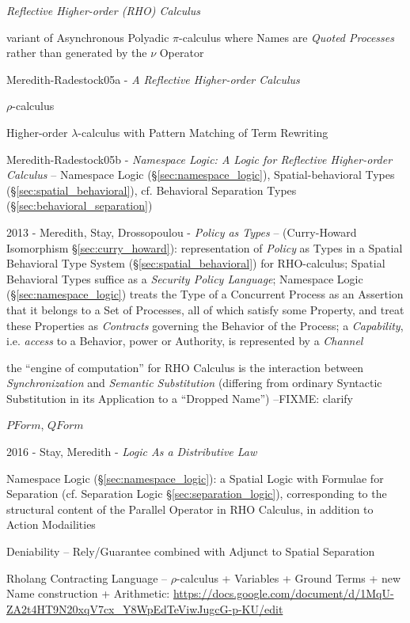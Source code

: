 \emph{Reflective Higher-order (RHO) Calculus}

variant of Asynchronous Polyadic $\pi$-calculus where Names are \emph{Quoted
  Processes} rather than generated by the $\nu$ Operator

Meredith-Radestock05a - \emph{A Reflective Higher-order Calculus}

$\rho$-calculus

Higher-order $\lambda$-calculus with Pattern Matching of Term
Rewriting %

Meredith-Radestock05b - \emph{Namespace Logic: A Logic for Reflective
  Higher-order Calculus} --
Namespace Logic (\S\ref{sec:namespace_logic}), Spatial-behavioral Types
(\S\ref{sec:spatial_behavioral}), cf. Behavioral Separation Types
(\S\ref{sec:behavioral_separation})

2013 - Meredith, Stay, Drossopoulou - \emph{Policy as Types} -- (Curry-Howard
Isomorphism \S\ref{sec:curry_howard}): representation of \emph{Policy} as Types
in a Spatial Behavioral Type System (\S\ref{sec:spatial_behavioral}) for
RHO-calculus; Spatial Behavioral Types suffice as a \emph{Security Policy
  Language}; Namespace Logic (\S\ref{sec:namespace_logic}) treats
the Type of a Concurrent Process as an Assertion that it belongs to a Set of
Processes, all of which satisfy some Property, and treat these Properties as
\emph{Contracts} governing the Behavior of the Process; a \emph{Capability},
i.e. \emph{access} to a Behavior, power or Authority, is represented by a
\emph{Channel}

the ``engine of computation'' for RHO Calculus is the interaction between
\emph{Synchronization} and \emph{Semantic Substitution} (differing from
ordinary Syntactic Substitution in its Application to a ``Dropped Name'')
--FIXME: clarify

$PForm$, $QForm$

2016 - Stay, Meredith - \emph{Logic As a Distributive Law}

Namespace Logic (\S\ref{sec:namespace_logic}): a Spatial Logic with Formulae
for Separation (cf. Separation Logic \S\ref{sec:separation_logic}),
corresponding to the structural content of the Parallel Operator in RHO
Calculus, in addition to Action Modailities

Deniability -- Rely/Guarantee combined with Adjunct to Spatial Separation

Rholang Contracting Language -- $\rho$-calculus + Variables + Ground Terms +
new Name construction + Arithmetic:
\url{https://docs.google.com/document/d/1MqU-ZA2t4HT9N20xqV7cx_Y8WpEdTeViwJugcG-p-KU/edit}

